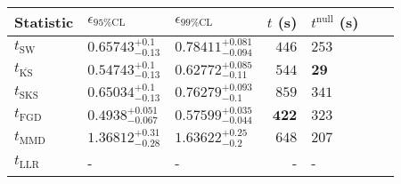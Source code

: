 \begin{tabular}{l|llr|llr}
	Statistic & $\epsilon_{95\%\mathrm{CL}}$ & $\epsilon_{99\%\mathrm{CL}}$ & $t$ (s) & $t^{\mathrm{null}}$ (s) \\
	\midrule
	$t_{\mathrm{SW}}$ & $0.65743_{-0.13}^{+0.1}$ & $0.78411_{-0.094}^{+0.081}$ & $446$ & $253$ \\
	$t_{\overline{\mathrm{KS}}}$ & $0.54743_{-0.13}^{+0.1}$ & $0.62772_{-0.11}^{+0.085}$ & $544$ & ${\mathbf{29}}$ \\
	$t_{\mathrm{SKS}}$ & $0.65034_{-0.13}^{+0.1}$ & $0.76279_{-0.1}^{+0.093}$ & $859$ & $341$ \\
	$t_{\mathrm{FGD}}$ & ${\mathbf{0.4938_{-0.067}^{+0.051}}}$ & ${\mathbf{0.57599_{-0.044}^{+0.035}}}$ & ${\mathbf{422}}$ & $323$ \\
	$t_{\mathrm{MMD}}$ & $1.36812_{-0.28}^{+0.31}$ & $1.63622_{-0.2}^{+0.25}$ & $648$ & $207$ \\
	$t_{\mathrm{LLR}}$ & - & - & - & - \\
	\bottomrule
\end{tabular}